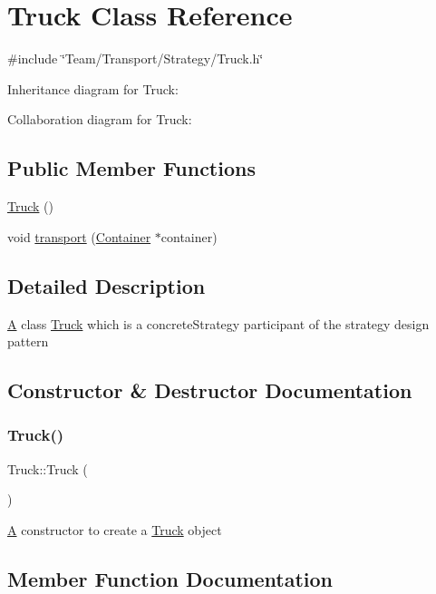 \hypertarget{classTruck}{}\section{Truck Class Reference}
\label{classTruck}


{\ttfamily \#include \char`\"{}Team/\+Transport/\+Strategy/\+Truck.\+h\char`\"{}}



Inheritance diagram for Truck\+:


Collaboration diagram for Truck\+:
\subsection*{Public Member Functions}
\begin{DoxyCompactItemize}
\item 
\hyperlink{classTruck_a87e358bca8fe34e6299c6ff233afb08b}{Truck} ()
\item 
void \hyperlink{classTruck_a260ad20acea80d5b4faa2a9d97eaa8e9}{transport} (\hyperlink{classContainer}{Container} $\ast$container)
\end{DoxyCompactItemize}


\subsection{Detailed Description}
\hyperlink{classA}{A} class \hyperlink{classTruck}{Truck} which is a concrete\+Strategy participant of the strategy design pattern 

\subsection{Constructor \& Destructor Documentation}
\mbox{\label{classTruck_a87e358bca8fe34e6299c6ff233afb08b}} 
\subsubsection{\texorpdfstring{Truck()}{Truck()}}
{\footnotesize\ttfamily Truck\+::\+Truck (\begin{DoxyParamCaption}{ }\end{DoxyParamCaption})}

\hyperlink{classA}{A} constructor to create a \hyperlink{classTruck}{Truck} object 

\subsection{Member Function Documentation}
\mbox{\label{classTruck_a260ad20acea80d5b4faa2a9d97eaa8e9}} 
